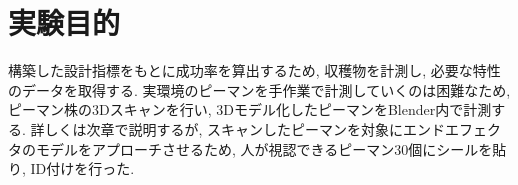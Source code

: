 \section{実験目的}
構築した設計指標をもとに成功率を算出するため, 収穫物を計測し, 必要な特性のデータを取得する.
実環境のピーマンを手作業で計測していくのは困難なため, ピーマン株の3Dスキャンを行い, 3Dモデル化したピーマンをBlender内で計測する.
詳しくは次章で説明するが, スキャンしたピーマンを対象にエンドエフェクタのモデルをアプローチさせるため, 人が視認できるピーマン30個にシールを貼り, ID付けを行った.
